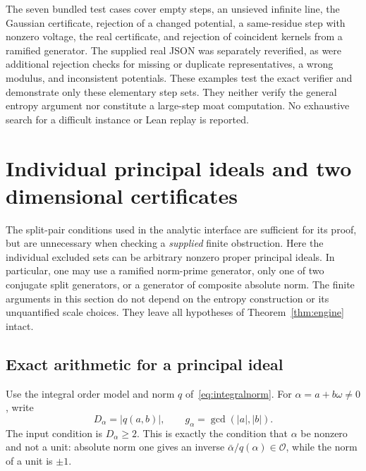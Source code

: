 \documentclass[11pt]{article}
\numberwithin{equation}{section}
\theoremstyle{definition}\newtheorem{definition}[theorem]{Definition}
\theoremstyle{remark}\newtheorem{remark}[theorem]{Remark}
\newcommand{\OO}{\mathcal O}\newcommand{\PP}{\mathcal P}
\newcommand{\abs}[1]{\lvert #1\rvert}
\begin{document}
The seven bundled test cases cover empty steps, an unsieved infinite line, the Gaussian certificate, rejection of a changed potential, a same-residue step with nonzero voltage, the real certificate, and rejection of coincident kernels from a ramified generator. The supplied real JSON was separately reverified, as were additional rejection checks for missing or duplicate representatives, a wrong modulus, and inconsistent potentials. These examples test the exact verifier and demonstrate only these elementary step sets. They neither verify the general entropy argument nor constitute a large-step moat computation. No exhaustive search for a difficult instance or Lean replay is reported.

\section{Individual principal ideals and two dimensional certificates}\label{sec:principal}

The split-pair conditions used in the analytic interface are sufficient for its proof, but are unnecessary when checking a \emph{supplied} finite obstruction. Here the individual excluded sets can be arbitrary nonzero proper principal ideals. In particular, one may use a ramified norm-prime generator, only one of two conjugate split generators, or a generator of composite absolute norm. The finite arguments in this section do not depend on the entropy construction or its unquantified scale choices. They leave all hypotheses of Theorem~\ref{thm:engine} intact.

\subsection{Exact arithmetic for a principal ideal}

Use the integral order model and norm $q$ of~\eqref{eq:integralnorm}. For $\alpha=a+b\omega\ne0$, write
\[
 D_\alpha=\abs{q(a,b)},\qquad g_\alpha=\gcd(\abs a,\abs b).
\]
The input condition is $D_\alpha\ge2$. This is exactly the condition that $\alpha$ be nonzero and not a unit: absolute norm one gives an inverse $\bar\alpha/q(\alpha)\in\OO$, while the norm of a unit is $\pm1$.
\end{document}

